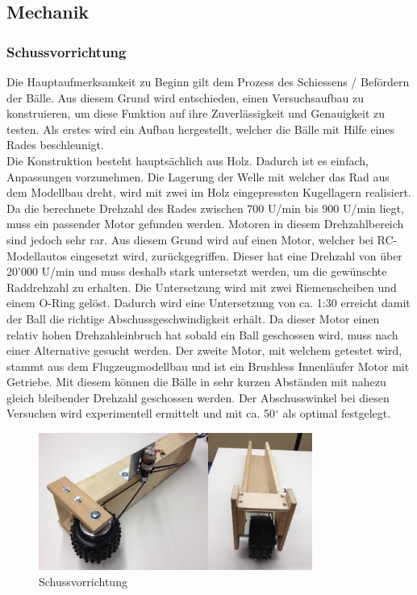 \subsection{Mechanik}

\subsubsection{Schussvorrichtung}
Die Hauptaufmerksamkeit zu Beginn gilt dem Prozess des Schiessens / Befördern 
der Bälle. Aus diesem Grund wird entschieden, einen Versuchsaufbau zu 
konstruieren, um diese Funktion auf ihre Zuverlässigkeit und Genauigkeit zu 
testen. Als erstes wird ein Aufbau hergestellt, welcher die Bälle mit Hilfe 
eines Rades beschleunigt. \\
%
Die Konstruktion besteht hauptsächlich aus Holz. Dadurch ist es einfach, Anpassungen 
vorzunehmen. Die Lagerung der Welle mit welcher das 
Rad aus dem Modellbau dreht, wird mit zwei im Holz eingepressten Kugellagern 
realisiert. Da die berechnete Drehzahl des Rades zwischen 700 U/min bis 900 
U/min liegt, muss ein passender Motor gefunden werden. Motoren in diesem 
Drehzahlbereich sind jedoch sehr rar. Aus diesem Grund wird auf einen Motor, 
welcher bei RC-Modellautos eingesetzt wird, zurückgegriffen. Dieser hat 
eine Drehzahl von über 20'000 U/min und muss deshalb stark untersetzt werden, 
um die gewünschte Raddrehzahl zu erhalten. Die Untersetzung wird mit zwei 
Riemenscheiben und einem O-Ring gelöst. Dadurch wird eine Untersetzung von 
ca. 1:30 erreicht damit der Ball die richtige Abschussgeschwindigkeit erhält. 
Da dieser Motor einen relativ hohen Drehzahleinbruch hat sobald ein 
Ball geschossen wird, muss nach einer Alternative gesucht werden. Der 
zweite Motor, mit welchem getestet wird, stammt aus dem Flugzeugmodellbau und 
ist ein Brushless Innenläufer Motor mit Getriebe. Mit diesem können die 
Bälle in sehr kurzen Abständen mit nahezu gleich bleibender Drehzahl geschossen 
werden. Der Abschusswinkel bei diesen Versuchen wird experimentell ermittelt 
und mit ca. 50$^\circ$ als optimal festgelegt. \\
\begin{figure}[h!]          
	\centering             
	\includegraphics[width=0.8\textwidth]{fig/Schussvorrichtung.png}    
	\caption{Schussvorrichtung}
	
	\label{fig:Schussvorrichtung}
\end{figure}
